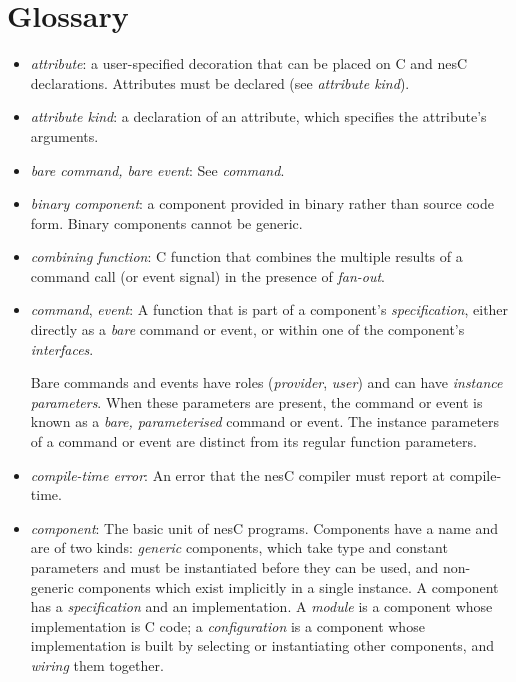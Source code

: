 \documentclass[11pt,letterpaper]{article}
\newcommand{\nesc}{nesC\xspace}
\begin{document}
\section{Glossary}
\label{sec:glossary}

\begin{itemize}
\item \emph{attribute}: a user-specified decoration that can be placed on C
and nesC declarations. Attributes must be declared (see \emph{attribute
kind}).

\item \emph{attribute kind}: a declaration of an attribute, which
specifies the attribute's arguments.

\item \emph{bare command, bare event}: See \emph{command}.

\item \emph{binary component}: a component provided in binary rather than
source code form. Binary components cannot be generic.

\item \emph{combining function}: C function that combines the multiple
results of a command call (or event signal) in the presence of
\emph{fan-out}.

\item \emph{command}, \emph{event}: A function that is part of a
component's \emph{specification}, either directly as a \emph{bare}
command or event, or within one of the component's \emph{interfaces}.

Bare commands and events have roles (\emph{provider}, \emph{user}) and can
have \emph{instance parameters}. When these parameters are present, the
command or event is known as a \emph{bare, parameterised} command or
event. The instance parameters of a command or event are distinct from its
regular function parameters.

\item \emph{compile-time error}: An error that the \nesc compiler must
report at compile-time.

\item \emph{component}: The basic unit of \nesc programs. Components have a
name and are of two kinds: \emph{generic} components, which take type and
constant parameters and must be instantiated before they can be used, and
non-generic components which exist implicitly in a single instance. A
component has a \emph{specification} and an implementation. A \emph{module}
is a component whose implementation is C code; a \emph{configuration} is a
component whose implementation is built by selecting or instantiating other
components, and \emph{wiring} them together.


\end{itemize}
\end{document}
